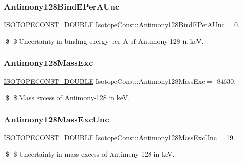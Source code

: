 \subsubsection{\texorpdfstring{Antimony128\+Bind\+E\+Per\+A\+Unc}{Antimony128BindEPerAUnc}}
{\footnotesize\ttfamily \mbox{\hyperlink{group___isotope_const-_macros_ga8f45a7272ce02c0b4c65c44636ed719a}{I\+S\+O\+T\+O\+P\+E\+C\+O\+N\+S\+T\+\_\+\+D\+O\+U\+B\+LE}} Isotope\+Const\+::\+Antimony128\+Bind\+E\+Per\+A\+Unc = 0.}

\$ \$ Uncertainty in binding energy per A of Antimony-\/128 in keV. \mbox{\label{group___isotope_const-_antimony-_sb128_ga106ad8e8ebcd96b80b5d4098316411ef}} 
\subsubsection{\texorpdfstring{Antimony128\+Mass\+Exc}{Antimony128MassExc}}
{\footnotesize\ttfamily \mbox{\hyperlink{group___isotope_const-_macros_ga8f45a7272ce02c0b4c65c44636ed719a}{I\+S\+O\+T\+O\+P\+E\+C\+O\+N\+S\+T\+\_\+\+D\+O\+U\+B\+LE}} Isotope\+Const\+::\+Antimony128\+Mass\+Exc = -\/84630.}

\$ \$ Mass excess of Antimony-\/128 in keV. \mbox{\label{group___isotope_const-_antimony-_sb128_ga35642ce3c1e40d17cb09e2e5e6a7203e}} 
\subsubsection{\texorpdfstring{Antimony128\+Mass\+Exc\+Unc}{Antimony128MassExcUnc}}
{\footnotesize\ttfamily \mbox{\hyperlink{group___isotope_const-_macros_ga8f45a7272ce02c0b4c65c44636ed719a}{I\+S\+O\+T\+O\+P\+E\+C\+O\+N\+S\+T\+\_\+\+D\+O\+U\+B\+LE}} Isotope\+Const\+::\+Antimony128\+Mass\+Exc\+Unc = 19.}

\$ \$ Uncertainty in mass excess of Antimony-\/128 in keV. \mbox{\label{group___isotope_const-_antimony-_sb128_ga6233333ff9c56defb1a7d881cd2b0aa0}} 
